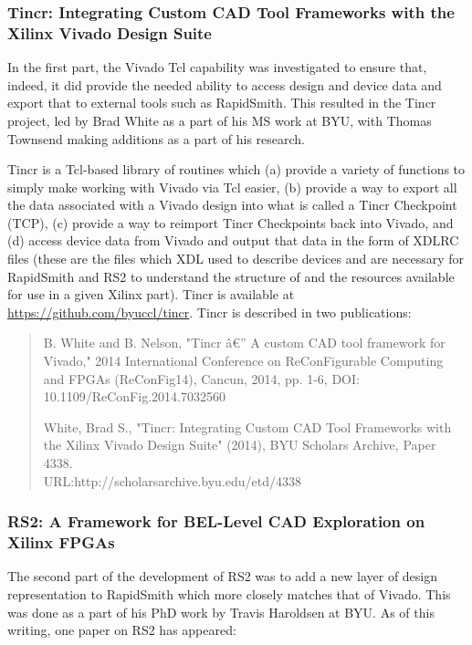 \documentclass[10pt]{article}
\begin{document}
\subsubsection{Tincr: Integrating Custom CAD Tool Frameworks with the Xilinx 
Vivado Design Suite} \label{sec:tincr}

In the first part, the Vivado Tcl capability was investigated to ensure that,
indeed, it did provide the needed ability to access design and device data and
export that to external tools such as RapidSmith.  This resulted in the Tincr
project, led by Brad White as a part of his MS work at BYU, with Thomas
Townsend making additions as a part of his research.

Tincr is a Tcl-based library of routines which (a) provide a variety of
functions to simply make working with Vivado via Tcl easier, (b) provide a way
to export all the data associated with a Vivado design into what is called a
Tincr Checkpoint (TCP), (c) provide a way to reimport Tincr Checkpoints back
into Vivado, and (d) access device data from Vivado and output that data in the
form of XDLRC files (these are the files which XDL used to describe devices and
are necessary for RapidSmith and RS2 to understand the structure of and the
resources available for use in a given Xilinx part).  Tincr is available at 
\href{https://github.com/byuccl/tincr}{\color{blue}https://github.com/byuccl/tincr}.
Tincr is described in two publications:

\begin{quotation}B. White and B. Nelson, "Tincr â€” A custom CAD tool framework
for Vivado," 2014 International Conference on ReConFigurable Computing and FPGAs (ReConFig14),
Cancun, 2014, pp. 1-6, DOI: 10.1109/ReConFig.2014.7032560

White, Brad S., "Tincr: Integrating Custom CAD Tool Frameworks with
the Xilinx Vivado Design Suite" (2014), BYU Scholars Archive, Paper 4338. 
\\URL:http://scholarsarchive.byu.edu/etd/4338
\end{quotation}

\subsubsection{RS2: A Framework for BEL-Level CAD Exploration on Xilinx FPGAs}
The second part of the development of RS2 was to add a new layer of design
representation to RapidSmith which more closely matches that of Vivado.  This
was done as a part of his PhD work by Travis Haroldsen at BYU.  As of this
writing, one paper on RS2 has appeared:
\end{document}
